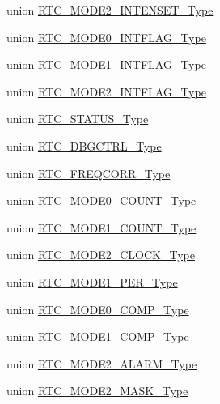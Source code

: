 \begin{DoxyCompactItemize}
\item 
union \mbox{\hyperlink{union_r_t_c___m_o_d_e2___i_n_t_e_n_s_e_t___type}{R\+T\+C\+\_\+\+M\+O\+D\+E2\+\_\+\+I\+N\+T\+E\+N\+S\+E\+T\+\_\+\+Type}}
\item 
union \mbox{\hyperlink{union_r_t_c___m_o_d_e0___i_n_t_f_l_a_g___type}{R\+T\+C\+\_\+\+M\+O\+D\+E0\+\_\+\+I\+N\+T\+F\+L\+A\+G\+\_\+\+Type}}
\item 
union \mbox{\hyperlink{union_r_t_c___m_o_d_e1___i_n_t_f_l_a_g___type}{R\+T\+C\+\_\+\+M\+O\+D\+E1\+\_\+\+I\+N\+T\+F\+L\+A\+G\+\_\+\+Type}}
\item 
union \mbox{\hyperlink{union_r_t_c___m_o_d_e2___i_n_t_f_l_a_g___type}{R\+T\+C\+\_\+\+M\+O\+D\+E2\+\_\+\+I\+N\+T\+F\+L\+A\+G\+\_\+\+Type}}
\item 
union \mbox{\hyperlink{union_r_t_c___s_t_a_t_u_s___type}{R\+T\+C\+\_\+\+S\+T\+A\+T\+U\+S\+\_\+\+Type}}
\item 
union \mbox{\hyperlink{union_r_t_c___d_b_g_c_t_r_l___type}{R\+T\+C\+\_\+\+D\+B\+G\+C\+T\+R\+L\+\_\+\+Type}}
\item 
union \mbox{\hyperlink{union_r_t_c___f_r_e_q_c_o_r_r___type}{R\+T\+C\+\_\+\+F\+R\+E\+Q\+C\+O\+R\+R\+\_\+\+Type}}
\item 
union \mbox{\hyperlink{union_r_t_c___m_o_d_e0___c_o_u_n_t___type}{R\+T\+C\+\_\+\+M\+O\+D\+E0\+\_\+\+C\+O\+U\+N\+T\+\_\+\+Type}}
\item 
union \mbox{\hyperlink{union_r_t_c___m_o_d_e1___c_o_u_n_t___type}{R\+T\+C\+\_\+\+M\+O\+D\+E1\+\_\+\+C\+O\+U\+N\+T\+\_\+\+Type}}
\item 
union \mbox{\hyperlink{union_r_t_c___m_o_d_e2___c_l_o_c_k___type}{R\+T\+C\+\_\+\+M\+O\+D\+E2\+\_\+\+C\+L\+O\+C\+K\+\_\+\+Type}}
\item 
union \mbox{\hyperlink{union_r_t_c___m_o_d_e1___p_e_r___type}{R\+T\+C\+\_\+\+M\+O\+D\+E1\+\_\+\+P\+E\+R\+\_\+\+Type}}
\item 
union \mbox{\hyperlink{union_r_t_c___m_o_d_e0___c_o_m_p___type}{R\+T\+C\+\_\+\+M\+O\+D\+E0\+\_\+\+C\+O\+M\+P\+\_\+\+Type}}
\item 
union \mbox{\hyperlink{union_r_t_c___m_o_d_e1___c_o_m_p___type}{R\+T\+C\+\_\+\+M\+O\+D\+E1\+\_\+\+C\+O\+M\+P\+\_\+\+Type}}
\item 
union \mbox{\hyperlink{union_r_t_c___m_o_d_e2___a_l_a_r_m___type}{R\+T\+C\+\_\+\+M\+O\+D\+E2\+\_\+\+A\+L\+A\+R\+M\+\_\+\+Type}}
\item 
union \mbox{\hyperlink{union_r_t_c___m_o_d_e2___m_a_s_k___type}{R\+T\+C\+\_\+\+M\+O\+D\+E2\+\_\+\+M\+A\+S\+K\+\_\+\+Type}}
\item 

\end{DoxyCompactItemize}
